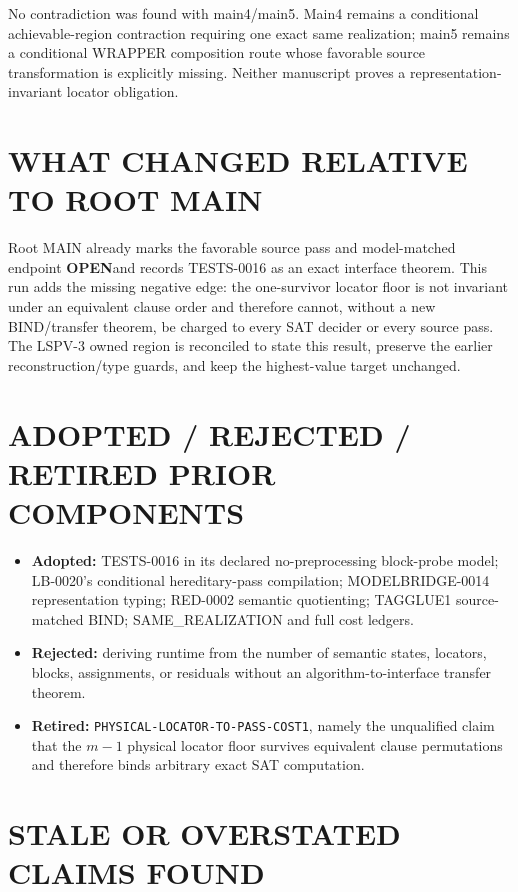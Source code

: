 \documentclass[11pt]{article}
\newcommand{\OPEN}{\textbf{OPEN}}
\begin{document}
No contradiction was found with main4/main5.  Main4 remains a conditional
achievable-region contraction requiring one exact same realization; main5
remains a conditional WRAPPER composition route whose favorable source
transformation is explicitly missing.  Neither manuscript proves a
representation-invariant locator obligation.

\section{WHAT CHANGED RELATIVE TO ROOT MAIN}

Root MAIN already marks the favorable source pass and model-matched endpoint
\OPEN and records TESTS-0016 as an exact interface theorem.  This run adds the
missing negative edge: the one-survivor locator floor is not invariant under
an equivalent clause order and therefore cannot, without a new BIND/transfer
theorem, be charged to every SAT decider or every source pass.  The LSPV-3
owned region is reconciled to state this result, preserve the earlier
reconstruction/type guards, and keep the highest-value target unchanged.

\section{ADOPTED / REJECTED / RETIRED PRIOR COMPONENTS}

\begin{itemize}[leftmargin=1.6em]
\item \textbf{Adopted:} TESTS-0016 in its declared no-preprocessing
block-probe model; LB-0020's conditional hereditary-pass compilation;
MODELBRIDGE-0014 representation typing; RED-0002 semantic quotienting;
TAGGLUE1 source-matched BIND; SAME\_REALIZATION and full cost ledgers.
\item \textbf{Rejected:} deriving runtime from the number of semantic states,
locators, blocks, assignments, or residuals without an algorithm-to-interface
transfer theorem.
\item \textbf{Retired:} \texttt{PHYSICAL-LOCATOR-TO-PASS-COST1}, namely the
unqualified claim that the $m-1$ physical locator floor survives equivalent
clause permutations and therefore binds arbitrary exact SAT computation.
\end{itemize}

\section{STALE OR OVERSTATED CLAIMS FOUND}
\end{document}
